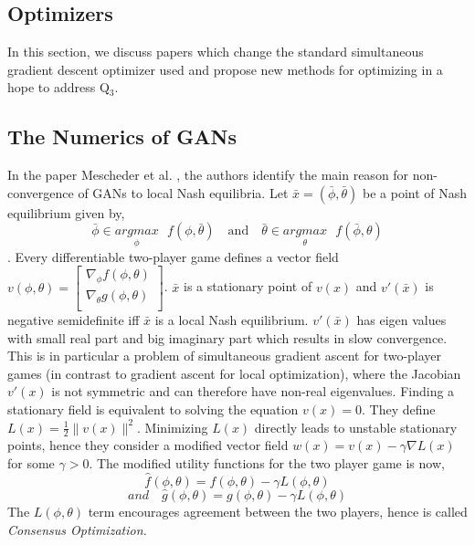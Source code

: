 \subsection{Optimizers}
\label{subsec:optim}
In this section, we discuss papers which change the standard simultaneous gradient descent optimizer used and propose new methods for optimizing in a hope to address Q$_3$.
\subsection*{The Numerics of GANs \citep{geiger06}} In the paper Mescheder et al. \citep{geiger06}, the authors identify the main reason for non-convergence of GANs to local Nash equilibria. Let $\bar{x} = (\bar{\phi}, \bar{\theta})$ be a point of Nash equilibrium given by, $$\bar{\phi} \in \underset{\phi}{argmax}\mbox{  }f(\phi, \bar{\theta}) \quad \text{and} \quad \bar{\theta} \in \underset{\theta}{argmax}\mbox{  }f(\bar{\phi}, \theta) $$. Every differentiable two-player game defines a vector field $v(\phi, \theta) = \begin{bmatrix}
\nabla_{\phi} f(\phi, \theta) \\
\nabla_{\theta} g(\phi, \theta) \\
\end{bmatrix}$. $\bar{x}$ is a stationary point of $v(x)$ and $v'(\bar{x})$ is negative semidefinite iff $\bar{x}$ is a local Nash equilibrium. $v'(\bar{x})$ has eigen values with small real part and big imaginary part which results in slow convergence. This is in particular a problem of simultaneous gradient ascent for two-player games (in contrast to gradient ascent for local optimization), where the Jacobian $v'(x)$ is not symmetric and can therefore have non-real eigenvalues. 
Finding a stationary field is equivalent to solving the equation $v(x) = 0$. They define $L(x) = \frac{1}{2}\parallel v(x)\parallel^2$. Minimizing $L(x)$ directly leads to unstable stationary points, hence they consider a modified vector field $w(x) = v(x) - \gamma \nabla L(x) $ for some $\gamma > 0$. The modified utility functions for the two player game is now, 
$$
\hat{f}(\phi, \theta) = f(\phi, \theta) - \gamma L(\phi, \theta) $$ 
$$and \quad \hat{g}(\phi, \theta) = g(\phi, \theta) - \gamma L(\phi, \theta) $$ The $L(\phi, \theta)$ term encourages agreement between the two players, hence is called \textit{Consensus Optimization.}

